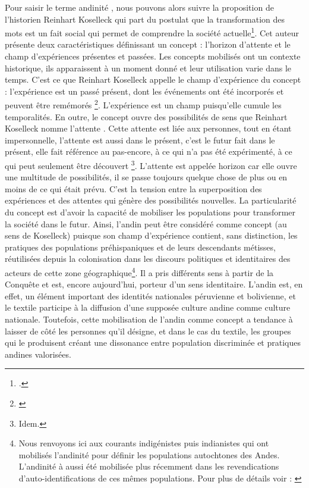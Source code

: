 Pour saisir le terme \og andinité \fg, nous pouvons alors suivre la proposition de l'historien Reinhart Koselleck qui part du postulat que la transformation des mots est un fait social qui permet de comprendre la société actuelle\footcite{koselleckEspacioExperienciaHorizonte1993}. 
Cet auteur présente deux caractéristiques définissant un concept : l'horizon d'attente et le champ d'expériences présentes et passées. 
Les concepts mobilisés ont un contexte historique, ils apparaissent à un moment donné et leur utilisation varie dans le temps. C'est ce que Reinhart Koselleck appelle le \og champ d'expérience \fg\: du concept : \og l'expérience est un passé présent, dont les événements ont été incorporés et peuvent être remémorés \fg\footnote{\cite[p.~338]{koselleckEspacioExperienciaHorizonte1993}}. L'expérience est un champ puisqu'elle cumule les temporalités. 
En outre, le concept ouvre des possibilités de sens que Reinhart Koselleck nomme \og l'attente \fg. Cette attente \og est liée aux personnes, tout en étant impersonnelle, l'attente est aussi dans le présent, c'est le futur fait dans le présent, elle fait référence au pas-encore, à ce qui n'a pas été expérimenté, à ce qui peut seulement être découvert \fg\footnote{Idem.}. L'attente est appelée horizon car elle ouvre une multitude de possibilités, il se passe toujours quelque chose de plus ou en moins de ce qui était prévu. C'est la tension entre la superposition des expériences et des attentes qui génère des possibilités nouvelles. La particularité du concept est d'avoir la capacité de mobiliser les populations pour transformer la société dans le futur. 
Ainsi, \og l'andin \fg \:peut être considéré comme concept (au sens de Koselleck) puisque son champ d'expérience contient, sans distinction, les pratiques des populations préhispaniques et de leurs descendants métisses, réutilisées depuis la colonisation dans les discours politiques et identitaires des acteurs de cette zone géographique\footnote{Nous renvoyons ici aux courants indigénistes puis indianistes qui ont mobilisés l'andinité pour définir les populations autochtones des Andes. L'andinité à aussi été mobilisée plus récemment dans les revendications d'auto-identifications de ces mêmes populations. Pour plus de détails voir : \cite{favreIndigenisme1996}}. Il a pris différents sens à partir de la Conquête et est, encore aujourd'hui, porteur d'un sens identitaire. L'andin est, en effet, un élément important des identités nationales péruvienne et bolivienne, et le textile participe à la diffusion d'une supposée culture andine comme culture nationale. Toutefois, cette mobilisation de l'andin comme concept a tendance à laisser de côté les personnes qu'il désigne, et dans le cas du textile, les groupes qui le produisent créant une dissonance entre population discriminée et pratiques andines valorisées. 


